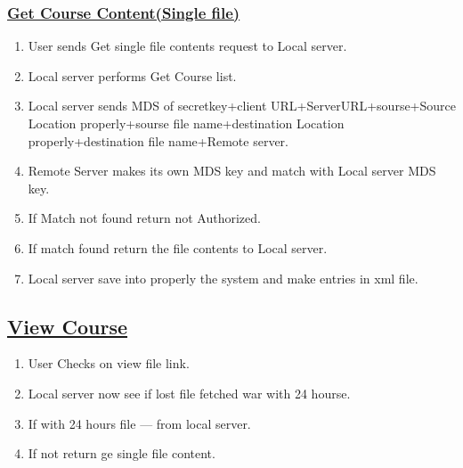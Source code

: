 \documentclass{article}
\begin{document}
\subsubsection*{\underline{Get Course Content(Single file)}}
\begin{enumerate}
\item User sends Get single file contents request to Local server.
\item Local server performs Get Course list.
\item Local server sends MDS of
       secretkey+client URL+ServerURL+sourse+Source Location properly+sourse file name+destination Location properly+destination file name+Remote server.
\item Remote Server makes its own MDS key and match with Local server MDS key.
\item If Match not found return not Authorized.
\item If match found return the file contents to Local server.
\item Local server save into properly the system and make entries in xml file.
\end{enumerate}
\begin{center}

\label{figure:GetContent.latex}
\end{center}
\subsection*{\underline{View Course}}
\begin{enumerate}
\item User Checks on view file link.
\item Local server now see if lost file fetched war with 24 hourse.
\item If with 24 hours file --- from local server.
\item If not return ge single file content.
\begin{center}

\label{figure:Viewcheck.latex}
\end{center}
\end{enumerate}
\end{document}
